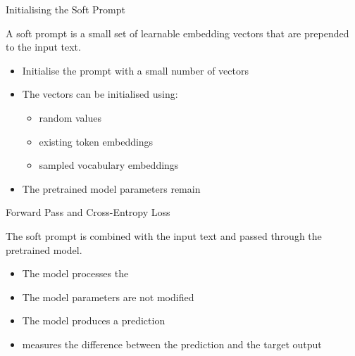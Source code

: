\documentclass[aspectratio=169,10pt]{beamer}
\begin{document}
\begin{frame}{Initialising the Soft Prompt}
  \small
  {\raggedright A soft prompt is a small set of learnable embedding vectors that are prepended to the input text.\par}
  \vskip0.12cm
  \begin{itemize}\itemsep2pt
    \item \small Initialise the prompt with a small number of vectors
    \item \small The vectors can be initialised using:
      \begin{itemize}\itemsep1pt
        \item \small random values
        \item \small existing token embeddings
        \item \small sampled vocabulary embeddings
      \end{itemize}
    \item \small The pretrained model parameters remain 
  \end{itemize}
  \vskip0.7cm
  \centering
  \resizebox{!}{1.6cm}{\ptsoftpromptinit}
  \vskip0.05cm
\end{frame}


\begin{frame}{Forward Pass and Cross-Entropy Loss}
  \small
  {\raggedright The soft prompt is combined with the input text and passed through the pretrained model.\par}
  
  \vskip0.12cm
  \begin{itemize}\itemsep4pt
    \item \small The model processes the 
    \item \small The model parameters are not modified
    \item \small The model produces a prediction
    \item \small {} measures the difference between the prediction and the target output
  \end{itemize}
  \vskip0.4cm
  \centering
   \resizebox{0.85\textwidth}{!}{\ptforwardloss}
  \vskip0.1cm
\end{frame}
\end{document}
